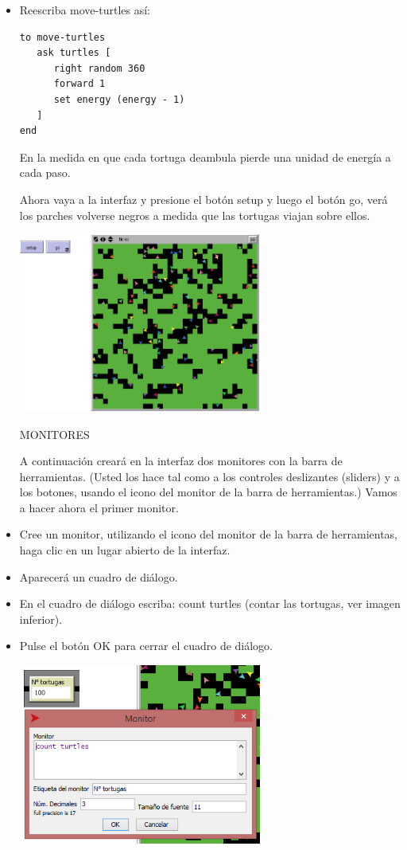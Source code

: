 \documentclass[12pt,letterpaper]{article}
\begin{document}
\begin{itemize}
\item Reescriba move-turtles así:

\begin{lstlisting}
to move-turtles
   ask turtles [
      right random 360
      forward 1
	  set energy (energy - 1)
   ] 
end
\end{lstlisting}

En la medida en que cada tortuga deambula pierde una unidad de energía a cada paso.

Ahora vaya a la interfaz y presione el botón setup y luego el botón go, verá los parches volverse negros a medida que las tortugas viajan sobre ellos.

\begin{center}
	\includegraphics[width=8cm]{./imagenes/image7.png}
\end{center}


\begin{center}
	 MONITORES
\end{center}

A continuación creará en la interfaz dos monitores con la barra de herramientas. (Usted los hace tal como a los controles deslizantes (sliders) y a los botones, usando el icono del monitor de la barra de herramientas.) Vamos a hacer ahora el primer monitor.


\item Cree un monitor, utilizando el icono del monitor de la barra de herramientas,  haga clic en un lugar abierto de la interfaz.
\item Aparecerá un cuadro de diálogo.
\item En el cuadro de diálogo escriba: count turtles (contar las tortugas, ver imagen inferior).
\item Pulse el botón OK para cerrar el cuadro de diálogo.

\begin{center}
	\includegraphics[width=8cm]{./imagenes/image8.png}
\end{center}


\end{itemize}
\end{document}

